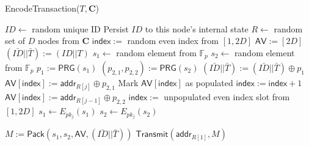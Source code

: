 \begin{algorithm}[t!]
\caption{{\sf EncodeTransaction}($T, \mathbf{C}$)}
\label{alg:encode}
\begin{algorithmic}[1]

	\State $ID \gets $ random unique ID
	\State Persist $ID$ to this node's internal state
	\State $R \gets$ random set of $D$ nodes from $\mathbf{C}$
	\State $\mathsf{index} :=$ random even index from $[1,2D]$ %
	\State $\mathsf{AV} := [2D]$ %
	\State $(\bar{ID} || \bar{T}) := (ID || T)$
	\State $s_1 \gets $ random element from $\mathbb{F}_p$
	\State $s_2 \gets $ random element from $\mathbb{F}_p$
		\State $p_1 := \mathsf{PRG}(s_1)$
		\State $(p_{2,1}, p_{2,2}) := \mathsf{PRG}(s_2)$
		\State $(\bar{ID} || \bar{T}) := (\bar{ID} || \bar{T}) \oplus p_1$
		\State $\mathsf{AV}[\mathsf{index}] := \mathsf{addr}_{R[j]} \oplus p_{2,1}$
		\State Mark $\mathsf{AV}[\mathsf{index}]$ as populated
		\State $\mathsf{index} := \mathsf{index} + 1$
		\State $\mathsf{AV}[\mathsf{index}] := \mathsf{addr}_{R[j-1]} \oplus p_{2,2}$
		\State $\mathsf{index} :=$ unpopulated even index slot from $[1,2D]$
		\State $s_1 \gets E_{pk_{j}}(s_1)$
		\State $s_2 \gets E_{pk_{j}}(s_2)$
	\EndFor

	

	\State $M := \mathsf{Pack}(s_1, s_2, \mathsf{AV}, (\bar{ID} || \bar{T}))$
	\State $\mathsf{\mathsf{Transmit}}(\mathsf{addr}_{R[1]}, M)$
\EndFor

\end{algorithmic}
\end{algorithm}

